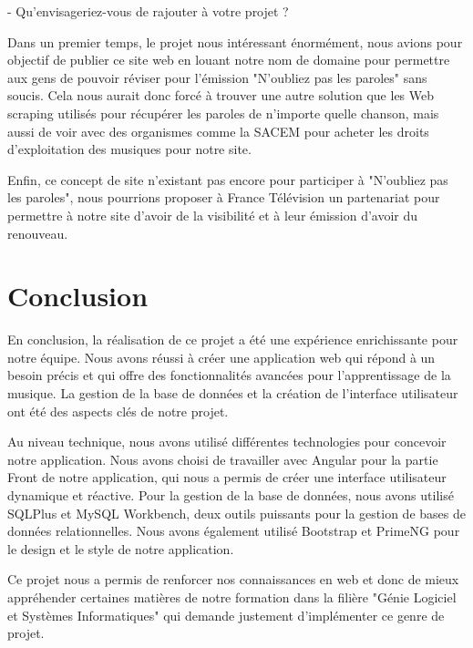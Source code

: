 \documentclass[12pt,french]{article}
\begin{document}
- Qu'envisageriez-vous de rajouter à votre projet ?
\newline

Dans un premier temps, le projet nous intéressant énormément, nous avions pour objectif de publier ce site web en louant notre nom de domaine pour permettre aux gens de pouvoir réviser pour l'émission "N'oubliez pas les paroles" sans soucis. Cela nous aurait donc forcé à trouver une autre solution que les \gls{Web scraping} utilisés pour récupérer les paroles de n'importe quelle chanson, mais aussi de voir avec des organismes comme la \gls{SACEM} pour acheter les droits d'exploitation des musiques pour notre site.

Enfin, ce concept de site n'existant pas encore pour participer à "N'oubliez pas les paroles", nous pourrions proposer à France Télévision un partenariat pour permettre à notre site d'avoir de la visibilité et à leur émission d'avoir du renouveau.

\newpage
\vspace*{5pt}

\section*{Conclusion}

En conclusion, la réalisation de ce projet a été une expérience enrichissante pour notre équipe. Nous avons réussi à créer une application web qui répond à un besoin précis et qui offre des fonctionnalités avancées pour l'apprentissage de la musique. La gestion de la base de données et la création de l'interface utilisateur ont été des aspects clés de notre projet.

\medskip

Au niveau technique, nous avons utilisé différentes technologies pour concevoir notre application. Nous avons choisi de travailler avec Angular pour la partie \gls{Front} de notre application, qui nous a permis de créer une interface utilisateur dynamique et réactive. Pour la gestion de la base de données, nous avons utilisé SQLPlus et MySQL Workbench, deux outils puissants pour la gestion de bases de données relationnelles. Nous avons également utilisé Bootstrap et PrimeNG pour le design et le style de notre application.

Ce projet nous a permis de renforcer nos connaissances en web et donc de mieux appréhender certaines matières de notre formation dans la filière "Génie Logiciel et Systèmes Informatiques" qui demande justement d'implémenter ce genre de projet.
\end{document}
